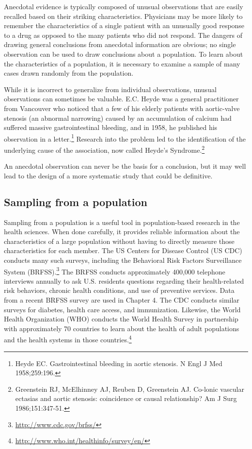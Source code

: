 Anecdotal evidence is typically composed of unusual observations that are easily recalled based on their striking characteristics. Physicians may be more likely to remember the characteristics of a single patient with an unusually good response to a drug as opposed to the many patients who did not respond.  The dangers of drawing general conclusions from anecdotal information are obvious; no single observation can be used to draw conclusions about a population. To learn about the characteristics of a population, it is necessary to examine a sample of many cases drawn randomly from the population.

While it is incorrect to generalize from individual observations, unusual observations can sometimes be valuable.  E.C. Heyde was a general practitioner from Vancouver who noticed that a few of his elderly patients with aortic-valve stenosis (an abnormal narrowing) caused by an accumulation of calcium had suffered massive gastrointestinal bleeding, and in 1958, he published his observation in a letter.\footnote{Heyde EC. Gastrointestinal bleeding in aortic stenosis. N Engl J Med 1958;259:196.} Research into the problem led to the identification of the underlying cause of the association, now called Heyde's Syndrome.\footnote{Greenstein RJ, McElhinney AJ, Reuben D, Greenstein AJ. Co-lonic vascular ectasias and aortic stenosis: coincidence or causal relationship? Am J Surg 1986;151:347-51.}

An anecdotal observation can never be the basis for a conclusion, but it may well lead to the design of a more systematic study that could be definitive.  


\subsection{Sampling from a population}

Sampling from a population is a useful tool in population-based research in the health sciences.  When done carefully, it provides reliable information about the  characteristics of a large population without having to directly measure those characteristics for each member.  The US Centers for Disease Control (US CDC) conducts many such surveys, including the Behavioral Risk Factors Surveillance System (BRFSS).\footnote{\url{ http://www.cdc.gov/brfss/}} The BRFSS conducts approximately 400,000 telephone interviews annually to ask U.S. residents questions regarding their health-related risk behaviors, chronic health conditions, and use of preventive services.  Data from a recent BRFSS survey are used in Chapter 4. The CDC conducts similar surveys for diabetes, health care access, and immunization. Likewise, the World Health Organization (WHO) conducts the World Health Survey in partnership  with approximately 70 countries to learn about the health of adult populations and the health systems in those countries.\footnote{\url{http://www.who.int/healthinfo/survey/en/}}  

